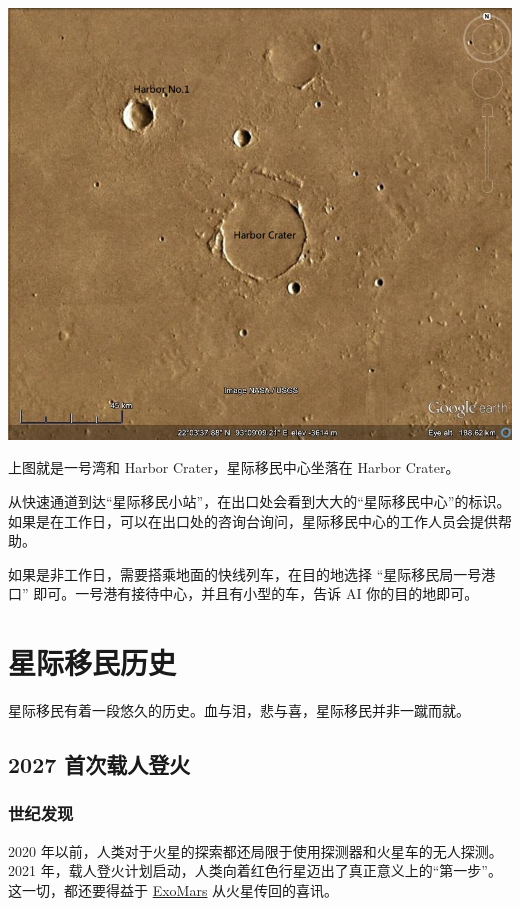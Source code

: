 \documentclass[letterpaper,10pt]{sphinxmanual}
\begin{document}
{\hfill\includegraphics{iimars.jpg}\hfill}

上图就是一号湾和 Harbor Crater，星际移民中心坐落在 Harbor Crater。

从快速通道到达“星际移民小站”，在出口处会看到大大的“星际移民中心”的标识。如果是在工作日，可以在出口处的咨询台询问，星际移民中心的工作人员会提供帮助。

如果是非工作日，需要搭乘地面的快线列车，在目的地选择 “星际移民局一号港口” 即可。一号港有接待中心，并且有小型的车，告诉 AI 你的目的地即可。


\section{星际移民历史}
\label{history::doc}\label{history:id1}
星际移民有着一段悠久的历史。血与泪，悲与喜，星际移民并非一蹴而就。


\subsection{2027 首次载人登火}
\label{history:id2}

\subsubsection{世纪发现}
\label{history:id3}
2020 年以前，人类对于火星的探索都还局限于使用探测器和火星车的无人探测。2021 年，载人登火计划启动，人类向着红色行星迈出了真正意义上的“第一步”。这一切，都还要得益于 \href{http://en.wikipedia.org/wiki/ExoMars}{ExoMars} 从火星传回的喜讯。
\end{document}
